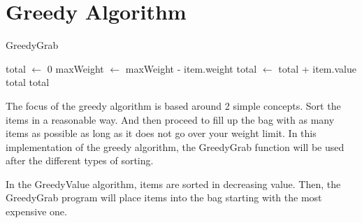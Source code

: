 \documentclass[10pt, letterpaper]{article}
\begin{document}
\section{Greedy Algorithm}

\begin{algorithm}[!htpf]
  \begin{algorithmic}
    \caption{GreedyGrab}\label{GreedyGrab}
    \State total $\gets$ 0
    \State maxWeight $\gets$ maxWeight - item.weight
    \State total $\gets$ total + item.value
    \EndIf
    \Return total
    \EndIf
    \EndFor
    \Return total
    \EndFunction
  \end{algorithmic}
\end{algorithm}

The focus of the greedy algorithm is based around 2 simple concepts. Sort the items in a reasonable way. And then proceed to fill up the bag with as many items as possible as long as it does not go over your weight limit. In this implementation of the greedy algorithm, the GreedyGrab function will be used after the different types of sorting.

In the GreedyValue algorithm, items are sorted in decreasing value. Then, the GreedyGrab program will place items into the bag starting with the most expensive one.

\end{document}
